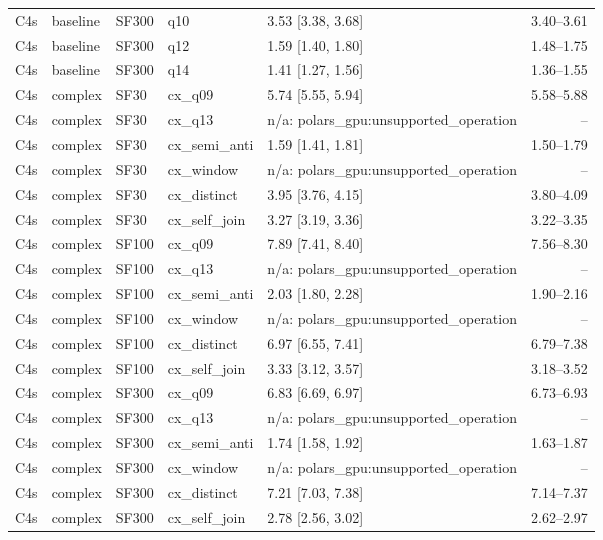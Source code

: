 \begin{longtable}{lllllr}
C4s & baseline & SF300 & q10 & 3.53 [3.38, 3.68] & 3.40--3.61 \\
C4s & baseline & SF300 & q12 & 1.59 [1.40, 1.80] & 1.48--1.75 \\
C4s & baseline & SF300 & q14 & 1.41 [1.27, 1.56] & 1.36--1.55 \\
C4s & complex & SF30 & cx\_q09 & 5.74 [5.55, 5.94] & 5.58--5.88 \\
C4s & complex & SF30 & cx\_q13 & n/a: polars\_gpu:unsupported\_operation & -- \\
C4s & complex & SF30 & cx\_semi\_anti & 1.59 [1.41, 1.81] & 1.50--1.79 \\
C4s & complex & SF30 & cx\_window & n/a: polars\_gpu:unsupported\_operation & -- \\
C4s & complex & SF30 & cx\_distinct & 3.95 [3.76, 4.15] & 3.80--4.09 \\
C4s & complex & SF30 & cx\_self\_join & 3.27 [3.19, 3.36] & 3.22--3.35 \\
C4s & complex & SF100 & cx\_q09 & 7.89 [7.41, 8.40] & 7.56--8.30 \\
C4s & complex & SF100 & cx\_q13 & n/a: polars\_gpu:unsupported\_operation & -- \\
C4s & complex & SF100 & cx\_semi\_anti & 2.03 [1.80, 2.28] & 1.90--2.16 \\
C4s & complex & SF100 & cx\_window & n/a: polars\_gpu:unsupported\_operation & -- \\
C4s & complex & SF100 & cx\_distinct & 6.97 [6.55, 7.41] & 6.79--7.38 \\
C4s & complex & SF100 & cx\_self\_join & 3.33 [3.12, 3.57] & 3.18--3.52 \\
C4s & complex & SF300 & cx\_q09 & 6.83 [6.69, 6.97] & 6.73--6.93 \\
C4s & complex & SF300 & cx\_q13 & n/a: polars\_gpu:unsupported\_operation & -- \\
C4s & complex & SF300 & cx\_semi\_anti & 1.74 [1.58, 1.92] & 1.63--1.87 \\
C4s & complex & SF300 & cx\_window & n/a: polars\_gpu:unsupported\_operation & -- \\
C4s & complex & SF300 & cx\_distinct & 7.21 [7.03, 7.38] & 7.14--7.37 \\
C4s & complex & SF300 & cx\_self\_join & 2.78 [2.56, 3.02] & 2.62--2.97 \\
\end{longtable}

